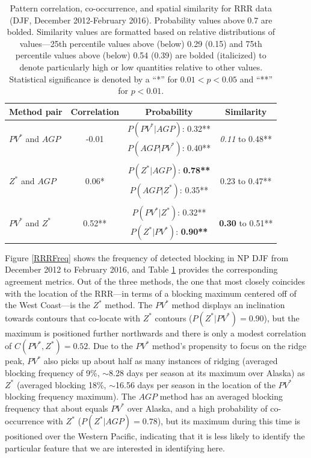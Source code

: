 \documentclass[smallextended]{svjour3}       %
\numberwithin{equation}{section}
\begin{document}
\begin{table}
\caption{Pattern correlation, co-occurrence, and spatial similarity for RRR data (DJF, December 2012-February 2016). Probability values above 0.7 are bolded. Similarity values are formatted based on relative distributions of values---25th percentile values above (below) 0.29 (0.15) and 75th percentile values above (below) 0.54 (0.39) are bolded (italicized) to denote particularly high or low quantities relative to other values. Statistical significance is denoted by a ``*'' for $0.01<p<0.05$ and ``**'' for $p<0.01$. }\label{RRRtable}
\centering
\begin{tabular}{|l|ccc|}
\hline
Method pair & Correlation & Probability & Similarity \\
\hline
\multirow{2}{*}{$PV^*$ and $AGP$} & \multirow{2}{*}{-0.01} & $P(PV^*|AGP)$: 0.32** & \multirow{2}{*}{\textit{0.11} to 0.48**} \\
& & $P(AGP | PV^*)$: {0.40** }& \\
& & & \\
\multirow{2}{*}{$Z^*$ and $AGP$} & \multirow{2}{*}{0.06*} & $P(Z^*|AGP)$: \textbf{0.78**} & \multirow{2}{*}{0.23 to 0.47**} \\
& & $P(AGP | Z^*)$: {0.35**} & \\
& & & \\
\multirow{2}{*}{$PV^*$ and $Z^*$} & \multirow{2}{*}{0.52**} & $P(PV^*|Z^*)$: 0.32** & \multirow{2}{*}{\textbf{0.30} to 0.51**} \\
& & $P(Z^* | PV^*)$: \textbf{0.90**} &  \\
\hline
\end{tabular}
\end{table}



Figure \ref{RRRFreq} shows the frequency of detected blocking in NP DJF from December 2012 to February 2016, and Table \ref{RRRtable} provides the corresponding agreement metrics. Out of the three methods, the one that most closely coincides with the location of the RRR---in terms of a blocking maximum centered off of the West Coast---is the $Z^*$ method. The $PV^*$ method displays an inclination towards contours that co-locate with $Z^*$ contours ($P(Z^*|PV^*)=0.90$), but the maximum is positioned further northwards and there is only a modest correlation of $C(PV^*, Z^*)=0.52$. Due to the $PV^*$ method's propensity to focus on the ridge peak, $PV^*$ also picks up about half as many instances of ridging (averaged blocking frequency of 9\%, $\sim$8.28 days per season at its maximum over Alaska) as $Z^*$ (averaged blocking 18\%, $\sim$16.56 days per season in the location of the $PV^*$ blocking frequency maximum). The $AGP$ method has an averaged blocking frequency that about equals $PV^*$ over Alaska, and a high probability of co-occurrence with $Z^*$ ($P(Z^*|AGP)=0.78$), but its maximum during this time is positioned over the Western Pacific, indicating that it is less likely to identify the particular feature that we are interested in identifying here. 
\end{document}
